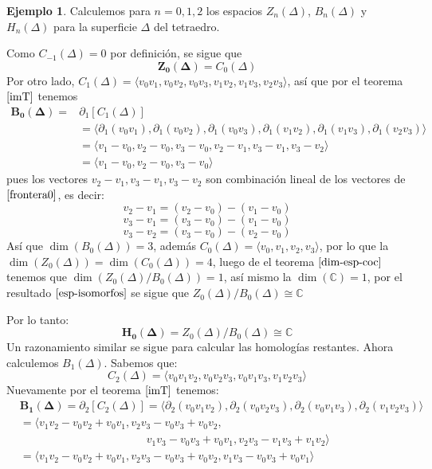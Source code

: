 \documentclass[12pt]{book}
\theoremstyle{definition}
\newtheorem{example}[theorem]{Ejemplo}
\newcounter{in}
\newcounter{ini}
\begin{document}
\begin{example}
  Calculemos para $n=0, 1, 2$ los espacios $Z_{n}(\Delta)$,
  $B_{n}(\Delta)$ y $H_{n}(\Delta)$ para la superficie $\Delta$ del tetraedro.

  Como $C_{-1}(\Delta)=0$ por definición, se sigue que
  $$\boldsymbol{Z_{0}(\Delta)}=C_{0}(\Delta)$$
  Por otro lado, $C_{1}(\Delta)=\langle v_{0}v_{1},v_{0}v_{2},v_{0}v_{3},v_{1}v_{2},v_{1}v_{3},v_{2}v_{3}\rangle$,
  así que por el teorema $\ref{imT}$ tenemos 
  \begin{align}
    \label{frontera0}
    \boldsymbol{B_{0}(\Delta)}=&\partial_{1}[C_{1}(\Delta)]\nonumber\\
    &=\langle \partial_{1}(v_{0}v_{1}),\partial_{1}(v_{0}v_{2}),\partial_{1}(v_{0}v_{3}),\partial_{1}(v_{1}v_{2}),\partial_{1}(v_{1}v_{3}),\partial_{1}(v_{2}v_{3})\rangle\nonumber\\
    &=\langle v_{1}-v_{0},v_{2}-v_{0},v_{3}-v_{0},v_{2}-v_{1},v_{3}-v_{1},v_{3}-v_{2}\rangle\nonumber\\
    &=\langle v_{1}-v_{0},v_{2}-v_{0},v_{3}-v_{0}\rangle
  \end{align} 
  pues los vectores $v_{2}-v_{1}, v_{3}-v_{1}, v_{3}-v_{2}$ son
  combinación lineal de los vectores de $\ref{frontera0}$, es decir:
  $$v_{2}-v_{1}=(v_{2}-v_{0})-(v_{1}-v_{0})$$
  $$v_{3}-v_{1}=(v_{3}-v_{0})-(v_{1}-v_{0})$$
  $$v_{3}-v_{2}=(v_{3}-v_{0})-(v_{2}-v_{0})$$
  Así que $\dim(B_{0}(\Delta))=3$, además $C_{0}(\Delta)=\langle
  v_{0},v_{1},v_{2},v_{3}\rangle$, por lo que la
  $\dim(Z_{0}(\Delta))=\dim(C_{0}(\Delta))=4$, luego de el teorema
  $\ref{dim-esp-coc}$ tenemos que
  $\dim(Z_{0}(\Delta)/B_{0}(\Delta))=1$, así mismo la
  $\dim(\mathbb{C})=1$, por el resultado $\ref{esp-isomorfos}$ se sigue
  que $Z_{0}(\Delta)/B_{0}(\Delta)\cong \mathbb{C}$

  Por lo tanto:
  $$\boldsymbol{H_{0}(\Delta)}=Z_{0}(\Delta)/B_{0}(\Delta)\cong \mathbb{C}$$
  Un razonamiento similar se sigue para calcular las homologías restantes.
  Ahora calculemos $B_{1}(\Delta)$. Sabemos que:
  $$C_{2}(\Delta)=\langle
  v_{0}v_{1}v_{2},v_{0}v_{2}v_{3},v_{0}v_{1}v_{3},v_{1}v_{2}v_{3}\rangle$$
  Nuevamente por el teorema $\ref{imT}$ tenemos:
  \begin{align}  
    \label{generadores-B1}
    &\boldsymbol{B_{1}(\Delta)}=\partial_{2}[C_{2}(\Delta)]=\langle\partial_{2}(v_{0}v_{1}v_{2}),\partial_{2}(v_{0}v_{2}v_{3}),\partial_{2}(v_{0}v_{1}v_{3}),\partial_{2}
    (v_{1}v_{2}v_{3})\rangle \nonumber\\
    &=\langle v_{1}v_{2}-v_{0}v_{2}+v_{0}v_{1},v_{2}v_{3}-v_{0}v_{3}+v_{0}v_{2},\nonumber\\
    &\phantom{{}=v_{1}v_{2}-v_{0}v_{2}+v_{0}v_{1},v_{2}v_{3}}v_{1}v_{3}-v_{0}v_{3}+v_{0}v_{1},v_{2}v_{3}-v_{1}v_{3}+v_{1}v_{2}\rangle\nonumber\\
    &=\langle v_{1}v_{2}-v_{0}v_{2}+v_{0}v_{1},v_{2}v_{3}-v_{0}v_{3}+v_{0}v_{2},v_{1}v_{3}-v_{0}v_{3}+v_{0}v_{1}\rangle
  \end{align} 
 

\end{example}
\end{document}
